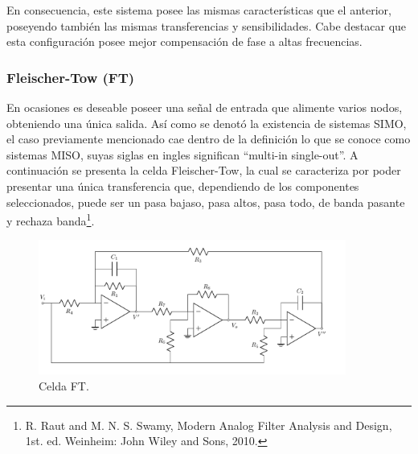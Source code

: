 En consecuencia, este sistema posee las mismas características que el anterior, poseyendo también las mismas transferencias y sensibilidades. Cabe destacar que esta configuración posee mejor compensación de fase a altas frecuencias.

\subsubsection{Fleischer-Tow (FT)}
En ocasiones es deseable poseer una señal de entrada que alimente varios nodos, obteniendo una única salida. Así como se denotó la existencia de sistemas SIMO, el caso previamente mencionado cae dentro de la definición lo que se conoce como sistemas MISO, suyas siglas en ingles significan ``multi-in single-out''. A continuación se presenta la celda Fleischer-Tow, la cual se caracteriza por poder presentar una única transferencia que, dependiendo de los componentes seleccionados, puede ser un pasa bajaso, pasa altos, pasa todo, de banda pasante y rechaza banda\footnote{R. Raut and M. N. S. Swamy, Modern Analog Filter Analysis and Design, 1st. ed. Weinheim: John Wiley and Sons, 2010.}.
\begin{figure}[H]
\centering
	\includegraphics[width=0.9\textwidth]{ImagenesEjercicio4/FT.pdf}
	\caption{Celda FT.}
	\label{fig:FT}
\end{figure}


